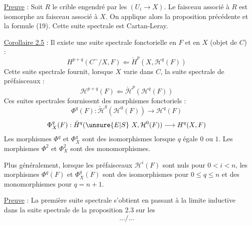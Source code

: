 
\uline{Preuve} : Soit $R$ le crible engendré par les $(U_i\longrightarrow X)$. Le faisceau associé à $R$ est isomorphe au faisceau associé à $X$. On applique alors la proposition précédente et la formule (19).
Cette suite spectrale est  Cartan-Leray.

\uline{Corollaire 2.5} : Il existe une suite spectrale fonctorielle en $F$ et en $X$ (objet de $C$) :
\[
H^{p+q}(C^{\sim}/X,F)\Longleftarrow\check H^p(X,\mathcal H^q(F))
\]
Cette suite spectrale fournit, lorsque $X$ varie dans $C$, la suite spectrale de préfaisceaux :
\[
\mathcal H^{p+q}(F)\Longleftarrow\check{\mathcal H}^{p}(\mathcal H^q(F))
\]
Ces suites spectrales fournissent des morphismes fonctoriels :
\margin{$\unsure{\checkmark}$}
\[
\Phi^q(F):\check{\mathcal H}^{q}(\mathcal H^0(F))\longrightarrow\mathcal H^q(F)
\]
\[
\Phi_X^q(F):\check H^q(\unsure{E|S}\ X,\mathcal H^0(F))\longrightarrow H^q(X,F)
\]
Les morphismes $\Phi^q$ et $\Phi_X^q$ sont des isomorphismes lorsque $q$ égale $0$ ou $1$. Les morphismes $\Phi^2$ et $\Phi_X^2$ sont des monomorphismes.

Plus généralement, lorsque les préfaisceaux $\mathcal H^i(F)$ sont nuls pour $0<i<n$, les morphismes $\Phi^q(F)$ et $\Phi_X^q(F)$ sont des isomorphismes pour $0\leq q\leq n$ et des monomorphismes pour $q=n+1$.

\uline{Preuve} : La première suite spectrale s'obtient en passant à la limite inductive dans la suite spectrale de la proposition 2.3 sur les
\[\ldots/\ldots\]
